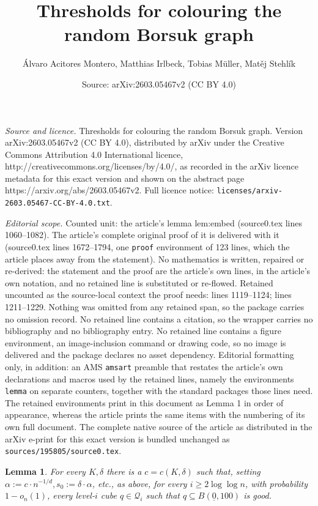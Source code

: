 \documentclass[10pt,a4paper]{amsart}
\title{Thresholds for colouring the random Borsuk graph}
\author{\'Alvaro Acitores Montero, Matthias Irlbeck, Tobias M\"uller, Mat\v{e}j Stehl\'ik}
\date{Source: arXiv:2603.05467v2 (CC BY 4.0)}
\newtheorem{lemma}{Lemma}
\newcommand{\Qcal}[0]{\ensuremath{{\mathcal Q}}}
\newcommand{\orig}{\underline{0}}
\begin{document}
\maketitle

\noindent\emph{Source and licence.} Thresholds for colouring the random Borsuk graph. Version arXiv:2603.05467v2 (CC BY 4.0), distributed by arXiv under the Creative Commons Attribution 4.0 International licence, http://creativecommons.org/licenses/by/4.0/, as recorded in the arXiv licence metadata for this exact version and shown on the abstract page https://arxiv.org/abs/2603.05467v2. Full licence notice: \texttt{licenses/arxiv-2603.05467-CC-BY-4.0.txt}.\par\smallskip

\noindent\textit{Editorial scope.} Counted unit: the article's lemma lem:embed (source0.tex lines 1060--1082). The article's complete original proof of it is delivered with it (source0.tex lines 1672--1794, one \texttt{proof} environment of 123 lines, which the article places away from the statement). No mathematics is written, repaired or re-derived: the statement and the proof are the article's own lines, in the article's own notation, and no retained line is substituted or re-flowed.  Retained uncounted as the source-local context the proof needs: lines 1119--1124; lines 1211--1229.  Nothing was omitted from any retained span, so the package carries no omission record.  No retained line contains a citation, so the wrapper carries no bibliography and no bibliography entry.  No retained line contains a figure environment, an image-inclusion command or drawing code, so no image is delivered and the package declares no asset dependency.  Editorial formatting only, in addition: an AMS \texttt{amsart} preamble that restates the article's own declarations and macros used by the retained lines, namely the environments \texttt{lemma} on separate counters, together with the standard packages those lines need.  The retained environments print in this document as Lemma 1 in order of appearance, whereas the article prints the same items with the numbering of its own full document.  The complete native source of the article as distributed in the arXiv e-print for this exact version is bundled unchanged as \texttt{sources/195805/source0.tex}.
\begin{lemma}\label{lem:boxes}
For every $K, \delta$ there is a $c = c(K,\delta)$ such that, 
setting $\alpha := c \cdot n^{-1/d}, s_0 := \delta \cdot \alpha$, etc., as above, for every $i \geq 2 \log\log n$, 
with probability $1-o_n(1)$, every level-$i$ cube $q \in \Qcal_i$ such that 
$q \subseteq B(\orig,100)$ is good.
\end{lemma}
\end{document}
